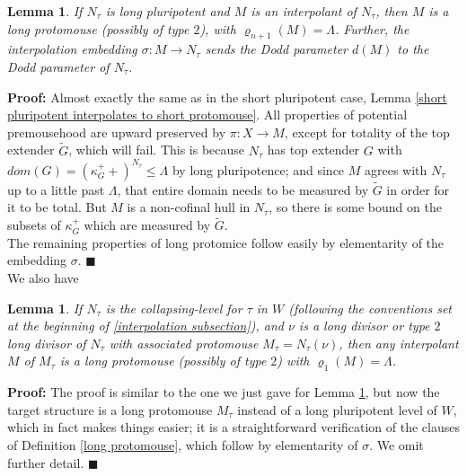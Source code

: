 \documentclass[12pt]{article}
\newtheorem{lem}[thm]{Lemma}
\begin{document}
\begin{lem} \label{long pluripotent interpolates to long protomouse}
If $N_\tau$ is long pluripotent and $M$ is an interpolant of $N_\tau$, then $M$ is a long protomouse (possibly of type $2$), with $\varrho_{n+1}(M) = \Lambda$.  Further, the interpolation embedding $\sigma : M \longrightarrow N_\tau$ sends the Dodd parameter $d(M)$ to the Dodd parameter of $N_\tau$.
\end{lem}

\indent \indent \textbf{Proof:}  Almost exactly the same as in the short pluripotent case, Lemma \ref{short pluripotent interpolates to short protomouse}.  All properties of potential premousehood are upward preserved by $\pi: X \longrightarrow M$, except for totality of the top extender $\tilde{G}$, which will fail. This is because $N_\tau$ has top extender $G$ with $dom(G) = (\kappa_G^++)^{N_\tau} \leq \Lambda$ by long pluripotence; and since $M$ agrees with $N_\tau$ up to a little past $\Lambda$, that entire domain needs to be measured by $\tilde{G}$ in order for it to be total.  But $M$ is a non-cofinal hull in $N_\tau$, so there is some bound on the subsets of $\kappa_G^+$ which are measured by $\tilde{G}$.\\

The remaining properties of long protomice follow easily by elementarity of the embedding $\sigma$. $\blacksquare$\\


We also have

\begin{lem} \label{associated long protomouse interpolates to long protomouse}
If $N_\tau$ is the collapsing-level for $\tau$ in $W$ (following the conventions set at the beginning of \ref{interpolation subsection}), and $\nu$ is a long divisor or type $2$ long divisor of $N_\tau$ with associated protomouse $M_\tau = N_\tau (\nu )$, then any interpolant $M$ of $M_\tau$ is a long protomouse (possibly of type $2$) with $\varrho_{1}(M) = \Lambda$.
\end{lem}

\textbf{Proof:}  The proof is similar to the one we just gave for Lemma \ref{long pluripotent interpolates to long protomouse}, but now the target structure is a long protomouse $M_\tau$ instead of a long pluripotent level of $W$, which in fact makes things easier; it is a straightforward verification of the clauses of Definition \ref{long protomouse}, which follow by elementarity of $\sigma$. We omit further detail.  $\blacksquare$\\
\end{document}
